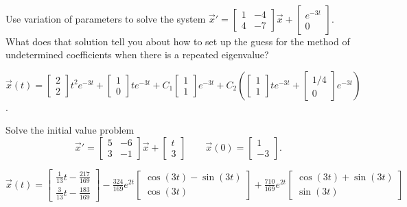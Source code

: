\begin{exercise}
\ 
\begin{tasks} 
\task Use variation of parameters to solve the system $\vec{x}'=\begin{bmatrix}1&-4\\ 4&-7\end{bmatrix}\vec{x}+\displaystyle \begin{bmatrix} e^{-3t} \\ 0 \end{bmatrix}$.
\task What does that solution tell you about how to set up the guess for the method of undetermined coefficients when there is a repeated eigenvalue?
\end{tasks}
\end{exercise}
\comboSol{%
}
{%
$\vec{x}(t) = \left[\begin{smallmatrix} 2 \\ 2 \end{smallmatrix}\right]t^2e^{-3t} + \left[\begin{smallmatrix} 1 \\ 0 \end{smallmatrix}\right]te^{-3t}+ C_1 \left[\begin{smallmatrix} 1 \\ 1 \end{smallmatrix}\right]e^{-3t} + C_2\left(\left[\begin{smallmatrix} 1 \\ 1 \end{smallmatrix}\right]te^{-3t} + \left[\begin{smallmatrix} 1/4 \\ 0 \end{smallmatrix}\right]e^{-3t}\right)$.
}

\begin{exercise}
Solve the initial value problem
\[ {\vec{x}}' = \begin{bmatrix} 5 & -6 \\ 3 & -1 \end{bmatrix}\vec{x} + \begin{bmatrix} t \\ 3 \end{bmatrix} \qquad \vec{x}(0) = \begin{bmatrix} 1 \\ -3 \end{bmatrix}. \]
\end{exercise}
\comboSol{%
}
{%
$\vec{x}(t) = \left[\begin{smallmatrix} \frac{1}{13}t - \frac{217}{169} \\ \frac{3}{13}t - \frac{183}{169} \end{smallmatrix}\right] - \frac{324}{169} e^{2t}\left[\begin{smallmatrix} \cos(3t) - \sin(3t) \\ \cos(3t) \end{smallmatrix}\right] + \frac{710}{169}e^{2t}\left[\begin{smallmatrix} \cos(3t) + \sin(3t) \\ \sin(3t) \end{smallmatrix}\right]$
}

